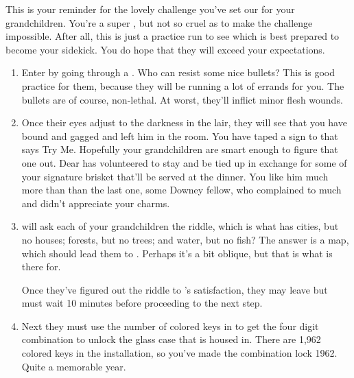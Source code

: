 \documentclass[green]{LRSguildcamp1}
\begin{document}
\name{\gGrandmasChallenge{}}

This is your reminder for the lovely challenge you've set our for your grandchildren. You're a super \cGrandma{\villain}, but not so cruel as to make the challenge impossible. After all, this is just a practice run to see which is best prepared to become your sidekick. You do hope that they will exceed your expectations. 

\begin{enumerate}
\item Enter \pGrandmasLair{} by going through a \sBullets{}. Who can resist some nice bullets? This is good practice for them, because they will be running a lot of errands for you. The bullets are of course, non-lethal.  At worst, they'll inflict minor flesh wounds.


\item Once their eyes adjust to the darkness in the lair, they will see that you have bound and gagged \cChrisHemsworth{\intro} and left him in the room. You have taped a sign to \cChrisHemsworth{} that says Try Me. Hopefully your grandchildren are smart enough to figure that one out. Dear \cChrisHemsworth{} has volunteered to stay and be tied up in exchange for some of your signature brisket that'll be served at the dinner. You like him much more than than the last one, some Downey fellow,  who complained to much and didn't appreciate your charms. 


\item \cChrisHemsworth{} will ask each of your grandchildren the riddle, which is what has cities, but no houses; forests, but no trees; and water, but no fish? The answer is a map, which should lead them to \iArtworkThree{}. Perhaps it's a bit oblique, but that is what \cChrisHemsworth{} is there for. 

Once they've figured out the riddle to \cChrisHemsworth{}'s satisfaction, they may leave but must wait 10 minutes before proceeding to the next step. 

\item Next they must use the number of colored keys in \iArtworkThree{} to get the four digit combination to unlock the glass case that \iArtworkThree{} is housed in. There are 1,962 colored keys in the installation, so you've made the combination lock 1962. Quite a memorable year.  


\end{enumerate}
\end{document}

